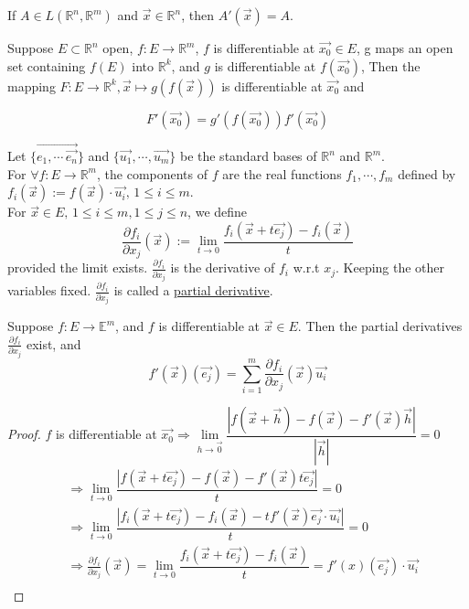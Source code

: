 \begin{example}
    If  $A\in L(\mathbb{R }^n,\mathbb{R}^m )$ and  $ \vec{x}\in\mathbb{R}^n  $, then  $ A'(\vec{x })=A $.  
\end{example}
\begin{theorem}
    Suppose  $ E \subset \mathbb{R }^n  $ open,  $ f:E\rightarrow\mathbb{R }^m  $,  $ f  $ is differentiable at  $ \vec{x_0}\in E  $, g maps an open set containing  $ f (E ) $ into  $ \mathbb{R }^k  $, and  $ g  $ is differentiable at  $ f(\vec{x_0}) $, Then the mapping  $ F:E\rightarrow \mathbb{R}^k, \vec{x }\mapsto g(f(\vec{x })) $ is differentiable at  $ \vec{x_0 } $ and 
    
    \begin{equation*}
         F'(\vec{x_0})=g'(f(\vec{x_0}))f'(\vec{x_0}) 
    \end{equation*}
\end{theorem}
Let  $ \{\vec{e_1,\cdots \,\vec{e_n }}\} $ and  $ \{\vec{u_1},\cdots,\vec{u_m }\} $ be the standard bases of  $ \mathbb{R }^n  $ and  $ \mathbb{R }^m $.\\
For  $ \forall f:E\rightarrow \mathbb{R}^m $, the components of  $ f  $ are the real functions  $ f_1,\cdots, f_m  $ defined by  $ f_i(\vec{x }):=f(\vec{x })\cdot \vec{u_i} ,\,1 \leqslant i \leqslant m$.\\
For  $ \vec{x }\in E,\,1 \leqslant i \leqslant m,1 \leqslant j \leqslant n  $, we define 
\[\frac{\partial f_i }{\partial x_j }(\vec{x }):=\lim\limits_{t\to 0 } \frac{f_i(\vec{x }+t\vec{e_j })-f_i(\vec{x})}{t} \]
provided the limit exists.  $ \frac{\partial f_i }{\partial x_j }  $ is the derivative of  $ f_i  $ w.r.t  $ x_j  $. Keeping the other variables fixed.  $ \frac{\partial f_i }{\partial x_j }  $ is called a \underline{partial derivative}.
\begin{theorem}
    Suppose  $ f:E\rightarrow \mathbb{E }^m  $, and  $ f  $ is differentiable at  $ \vec{x }\in E  $. Then the partial derivatives  $ \frac{\partial f_i }{\partial x_j } $ exist, and 
    \begin{equation}\tag{$  \star$}
        f'(\vec{x})(\vec{e_j })=\sum\limits_{i=1 }^{m }\frac{\partial f_i }{\partial x_j }(\vec{x})\vec{u_i} 
    \end{equation}
\end{theorem}     
\begin{proof}
     $ f  $ is differentiable at  $ \vec{x_0 }\Rightarrow \lim\limits_{h\to \vec{0} } \dfrac{|f(\vec{x}+\vec{h})-f(\vec{x})-f'(\vec{x})\vec{h}| }{|\vec{h}|}=0  $ \\
     \begin{align*}
        &\Rightarrow \lim\limits_{t\rightarrow 0 }\dfrac{|f(\vec{x}+t\vec{e_j})-f(\vec{x})-f'(\vec{x})t\vec{e_j}| }{t}=0\\
        &\Rightarrow \lim\limits_{t\rightarrow 0 }\dfrac{|f_i(\vec{x}+t\vec{e_j})-f_i(\vec{x})-tf'(\vec{x})\vec{e_j}\cdot \vec{u_i }| }{t}=0\\
        &\Rightarrow \frac{\partial f_i }{\partial x_j }(\vec{x })=\lim\limits_{t\to 0 } \dfrac{f_i(\vec{x }+t\vec{e_j })-f_i(\vec{x})}{t}=f'(x)(\vec{e_j})\cdot \vec{u_i} \\
     \end{align*}
\end{proof}
